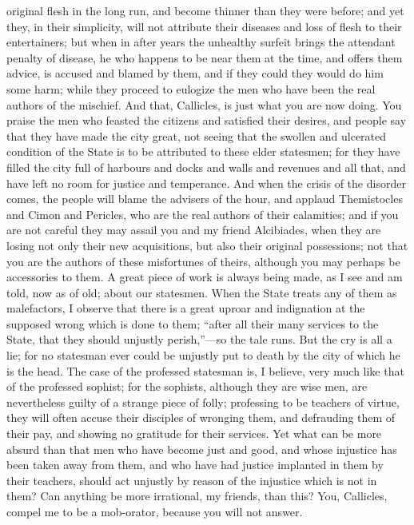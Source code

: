 \documentclass[11pt,letter]{article}
\begin{document}
original flesh in the long run, and become thinner than they were before; and yet they, in their simplicity, will not attribute their diseases and loss of flesh to their entertainers; but when in after years the unhealthy surfeit brings the attendant penalty of disease, he who happens to be near them at the time, and offers them advice, is accused and blamed by them, and if they could they would do him some harm; while they proceed to eulogize the men who have been the real authors of the mischief. And that, Callicles, is just what you are now doing. You praise the men who feasted the citizens and satisfied their desires, and people say that they have made the city great, not seeing that the swollen and ulcerated condition of the State is to be attributed to these elder statesmen; for they have filled the city full of harbours and docks and walls and revenues and all that, and have left no room for justice and temperance. And when the crisis of the disorder comes, the people will blame the advisers of the hour, and applaud Themistocles and Cimon and Pericles, who are the real authors of their calamities; and if you are not careful they may assail you and my friend Alcibiades, when they are losing not only their new acquisitions, but also their original possessions; not that you are the authors of these misfortunes of theirs, although you may perhaps be accessories to them. A great piece of work is always being made, as I see and am told, now as of old; about our statesmen. When the State treats any of them as malefactors, I observe that there is a great uproar and indignation at the supposed wrong which is done to them; “after all their many services to the State, that they should unjustly perish,”—so the tale runs. But the cry is all a lie; for no statesman ever could be unjustly put to death by the city of which he is the head. The case of the professed statesman is, I believe, very much like that of the professed sophist; for the sophists, although they are wise men, are nevertheless guilty of a strange piece of folly; professing to be teachers of virtue, they will often accuse their disciples of wronging them, and defrauding them of their pay, and showing no gratitude for their services. Yet what can be more absurd than that men who have become just and good, and whose injustice has been taken away from them, and who have had justice implanted in them by their teachers, should act unjustly by reason of the injustice which is not in them? Can anything be more irrational, my friends, than this? You, Callicles, compel me to be a mob-orator, because you will not answer.
\end{document}
